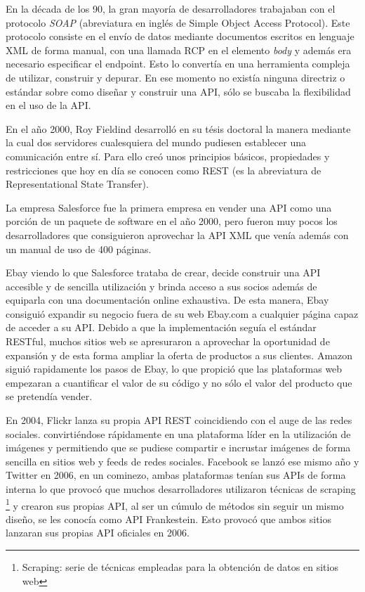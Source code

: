 En la década de los 90, la gran mayoría de desarrolladores trabajaban con el protocolo \textit{SOAP} (abreviatura en inglés de Simple Object Access Protocol). Este protocolo consiste en el envío de datos mediante documentos escritos en lenguaje XML de forma manual, con una llamada RCP en el elemento \textit{body} y además era necesario especificar el endpoint. Esto lo convertía en una herramienta compleja de utilizar, construir y depurar. En ese momento no existía ninguna directriz o estándar sobre como diseñar y construir una API, sólo se buscaba la flexibilidad en el uso de la API.

En el año 2000, Roy Fieldind desarrolló en su tésis doctoral la manera mediante la cual dos servidores cualesquiera del mundo pudiesen establecer una comunicación entre sí. Para ello creó unos principios básicos, propiedades y restricciones que hoy en día se conocen como REST (es la abreviatura de Representational State Transfer). 

La empresa Salesforce fue la primera empresa en vender una API como una porción de un paquete de software en el año 2000, pero fueron muy pocos los desarrolladores que consiguieron aprovechar la API XML que venía además con un manual de uso de 400 páginas. 

Ebay viendo lo que Salesforce trataba de crear, decide construir una API accesible y de sencilla utilización y brinda acceso a sus socios además de equiparla con una documentación online exhaustiva. De esta manera, Ebay consiguió expandir su negocio fuera de su web Ebay.com a cualquier página capaz de acceder a su API. Debido a que la implementación seguía el estándar RESTful, muchos sitios web se apresuraron a aprovechar la oportunidad de expansión y de esta forma ampliar la oferta de productos a sus clientes. Amazon siguió rapidamente los pasos de Ebay, lo que propició que las plataformas web empezaran a cuantificar el valor de su código y no sólo el valor del producto que se pretendía vender. 

En 2004, Flickr lanza su propia API REST coincidiendo con el auge de las redes sociales. convirtiéndose rápidamente en una plataforma líder en la utilización de imágenes y permitiendo que se pudiese compartir e incrustar imágenes de forma sencilla en sitios web y feeds de redes sociales. Facebook se lanzó ese mismo año y Twitter en 2006, en un cominezo, ambas plataformas tenían sus APIs de forma interna lo que provocó que muchos desarrolladores utilizaron técnicas de scraping \footnote{Scraping: serie de técnicas empleadas para la obtención de datos en sitios web} y crearon sus propias API, al ser un cúmulo de métodos sin seguir un mismo diseño, se les conocía como API Frankestein. Esto provocó que ambos sitios lanzaran sus propias API oficiales en 2006.

